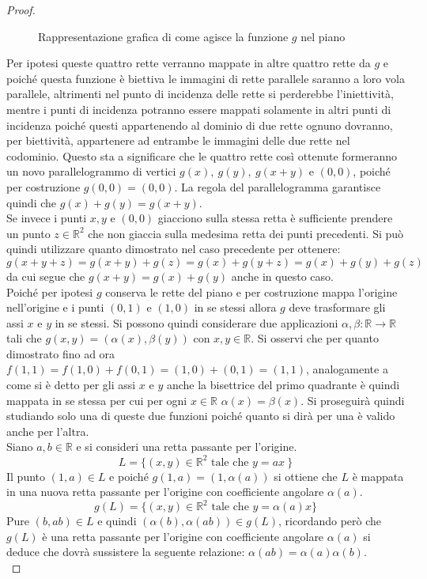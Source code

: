 \begin{proof}
\begin{figure}[h!]
\begin{tikzpicture}
	\end{tikzpicture}
	\caption{Rappresentazione grafica di come agisce la funzione $g$ nel piano}
	\label{Fig:PianoLinGen}
	\end{figure}
	Per ipotesi queste quattro rette verranno mappate in altre quattro rette da $g$ e poiché questa funzione è biettiva le immagini di rette parallele saranno a loro vola parallele, altrimenti nel punto di incidenza delle rette si perderebbe l'iniettività, mentre i punti di incidenza potranno essere mappati solamente in altri punti di incidenza poiché questi appartenendo al dominio di due rette ognuno dovranno, per biettività, appartenere ad entrambe le immagini delle due rette nel codominio. Questo sta a significare che le quattro rette così ottenute formeranno un novo parallelogrammo di vertici $g(x),\ g(y),\ g(x+y)$ e $(0,0)$, poiché per costruzione $g(0,0)=(0,0)$. La regola del parallelogramma garantisce quindi che $g(x)+g(y)=g(x+y)$.\\
	Se invece i punti $x,y$ e $(0,0)$ giacciono sulla stessa retta è sufficiente prendere un punto $z\in \mathbb{R}^2$ che non giaccia sulla medesima retta dei punti precedenti. Si può quindi utilizzare quanto dimostrato nel caso precedente per ottenere:
	\begin{equation*}
		g(x+y+z)=g(x+y)+g(z)= g(x)+g(y+z)=g(x)+g(y)+g(z)
	\end{equation*}
	da cui segue che $g(x+y)=g(x)+g(y)$ anche in questo caso.\\

    Poiché per ipotesi $g$ conserva le rette del piano e per costruzione mappa l'origine nell'origine e i punti $(0,1)$ e $(1,0)$ in se stessi allora $g$ deve trasformare gli assi $x$ e $y$ in se stessi. Si possono quindi considerare due applicazioni $\alpha,\beta:\mathbb{R} \rightarrow\mathbb{R} $ tali che $g(x,y)=(\alpha(x),\beta(y))$ con  $x,y\in\mathbb{R}$. Si osservi che per quanto dimostrato fino ad ora $f(1,1)=f(1,0)+f(0,1)=(1,0)+(0,1)=(1,1)$, analogamente a come si è detto per gli assi $x$ e $y$ anche la bisettrice del primo quadrante è quindi mappata in se stessa per cui per ogni $x\in\mathbb{R}$ $\alpha(x)=\beta(x)$. Si proseguirà quindi studiando solo una di queste due funzioni poiché quanto si dirà per una è valido anche per l'altra.\\

	Siano $a,b\in\mathbb{R}$ e si consideri una retta passante per l'origine.
	\begin{equation*}
		L=\{ (x,y)\in\mathbb{R}^2 \text{ tale che } y=ax\  \}
	\end{equation*}
    Il punto $(1,a)\in L$ e poiché $g(1,a)=(1,\alpha(a))$ si ottiene che $L$ è mappata in una nuova retta passante per l'origine con coefficiente angolare $\alpha(a)$.
	\begin{equation*}
		g(L)=\{ (x,y)\in\mathbb{R}^2 \text{ tale che } y=\alpha(a)x\}
	\end{equation*} 
	Pure $(b,ab)\in L$ e quindi $(\alpha(b),\alpha(ab))\in g(L)$, ricordando però che $g(L)$ è una retta passante per l'origine con coefficiente angolare $\alpha(a)$ si deduce che dovrà sussistere la seguente relazione: $\alpha(ab)=\alpha(a)\alpha(b)$.\\


\end{proof}
